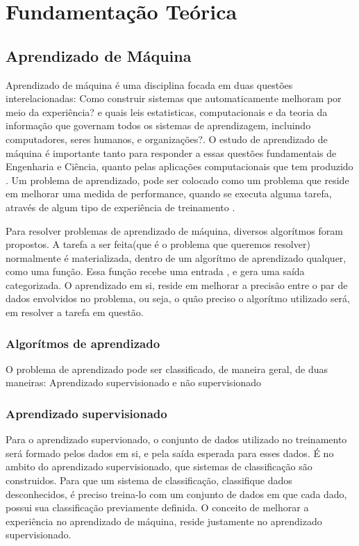 \chapter{Fundamentação Teórica}

\section{Aprendizado de Máquina}
Aprendizado de máquina é uma disciplina focada em duas questões interelacionadas: Como construir sistemas que automaticamente melhoram por meio da experiência? e quais  leis estatisticas,
computacionais e da teoria da informação que governam todos os sistemas de aprendizagem, incluindo computadores, seres humanos, e organizações?. O estudo de aprendizado de máquina é importante tanto
para responder a essas questões fundamentais de Engenharia e Ciência, quanto pelas aplicações computacionais que tem produzido \cite{Jordan}.
Um problema de aprendizado, pode ser colocado como um problema que reside em melhorar uma medida de performance, quando se executa alguma tarefa, através de algum tipo de experiência de treinamento \cite{Jordan}.



Para resolver problemas de aprendizado de máquina, diversos algorítmos foram propostos. A tarefa a ser feita(que é o problema que queremos resolver) normalmente é materializada, dentro de um algorítmo de aprendizado qualquer, como uma função.
Essa função recebe uma entrada , e gera uma saída categorizada. O aprendizado em si, reside em melhorar a precisão entre o par de dados envolvidos no problema, ou seja, o quão preciso o algorítmo utilizado será, em resolver a tarefa em questão.

\subsection{Algorítmos de aprendizado}

O problema de aprendizado pode ser classificado, de maneira geral, de duas maneiras: Aprendizado supervisionado e não supervisionado

\subsection{Aprendizado supervisionado}
Para o aprendizado supervionado, o conjunto de dados utilizado no treinamento será formado pelos dados em si, e pela saída esperada para esses dados\cite{Louridas}. É no ambito do aprendizado supervisionado,
que sistemas de classificação são construidos. Para que um sistema de classificação, classifique dados desconhecidos, é preciso treina-lo com um conjunto de dados em que cada dado, possui sua classificação previamente definida.
O conceito de melhorar a experiência no aprendizado de máquina, reside justamente no aprendizado supervisionado.

